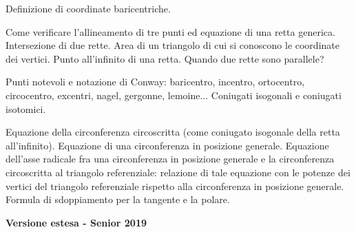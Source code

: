 \vspace{0.5cm}
Definizione di coordinate baricentriche. 

Come verificare l'allineamento di tre punti ed equazione di una retta generica. Intersezione di due rette. Area di un triangolo di cui si conoscono le coordinate dei vertici. Punto all'infinito di una retta. Quando due rette sono parallele?

Punti notevoli e notazione di Conway: baricentro, incentro, ortocentro, circocentro, excentri, nagel, gergonne, lemoine... Coniugati isogonali e coniugati isotomici.

Equazione della circonferenza circoscritta (come coniugato isogonale della retta all'infinito).
Equazione di una circonferenza in posizione generale. Equazione dell'asse radicale fra una circonferenza in posizione generale e la circonferenza circoscritta al triangolo referenziale: relazione di tale equazione con le potenze dei vertici del triangolo referenziale rispetto alla circonferenza in posizione generale. Formula di sdoppiamento per la tangente e la polare.

\vspace{0.3cm}
\large{\textbf{Versione estesa - Senior 2019}}\normalsize

